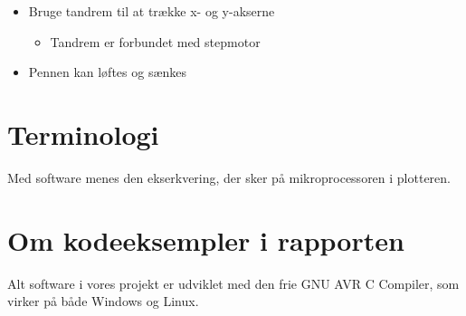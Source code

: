 \begin{itemize}
{    
    \label{fig:plotterskitse}
  }
\item Bruge tandrem til at trække x- og y-akserne
  \begin{itemize}
  \item Tandrem er forbundet med stepmotor
  \end{itemize}
\item Pennen kan løftes og sænkes
\end{itemize}


\section{Terminologi}


Med software menes den ekserkvering, der sker på mikroprocessoren i plotteren.


\section{Om kodeeksempler i rapporten}

Alt software i vores projekt er udviklet med den frie GNU AVR C
Compiler, som virker på både Windows og Linux.



